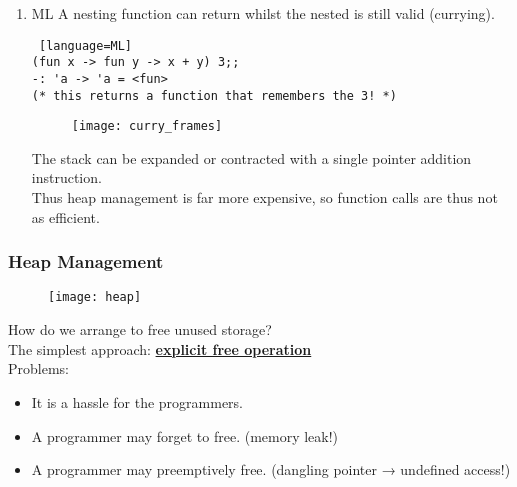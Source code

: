 \documentclass[../../lecture_notes.tex]{subfiles}
\begin{document}
\begin{enumerate} [itemsep=0mm]
		To make this work, functions are represented by a pair of pointers
			\begin{enumerate} [itemsep=0mm]
				\item a pointer to the code (ip)
				\item a pointer to the defining frame (op)
			\end{enumerate}

		A function is thus an (ip, op) pair.\\
		These pointers are called FAT, since they hold two words as opposed to thin C pointers.\\
		This is how continuations work!

	\item ML
	A nesting function can return whilst the nested is still valid (currying).
		\begin{lstlisting} [language=ML]
(fun x -> fun y -> x + y) 3;;
-: 'a -> 'a = <fun>
(* this returns a function that remembers the 3! *)
		\end{lstlisting}

	\begin{figure}[H]
		\centering
		\texttt{[image: curry\_frames]}
		\label{fig:test}
	\end{figure}

\noindent The stack can be expanded or contracted with a single pointer addition instruction.\\
Thus heap management is far more expensive, so function calls are thus not as efficient.
\end{enumerate}

\subsubsection*{Heap Management}

\begin{figure}[H]
	\centering
	\texttt{[image: heap]}
	\caption{}
	\label{fig:test}
\end{figure}

How do we arrange to free unused storage?\\
The simplest approach: \textbf{\underline{explicit free operation}}\\
	\indent Problems: \begin{itemize} [itemsep=0mm]
		\item It is a hassle for the programmers.
		\item A programmer may forget to free. (memory leak!)
		\item A programmer may preemptively free. (dangling pointer → undefined access!)
	\end{itemize}
\end{document}
